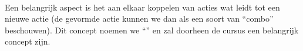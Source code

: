 \paragraph{}Een belangrijk aspect is het aan elkaar koppelen van acties wat leidt tot een nieuwe actie (de gevormde actie kunnen we dan als een soort van ``combo'' beschouwen). Dit concept noemen we ``'' en zal doorheen de cursus een belangrijk concept zijn.

